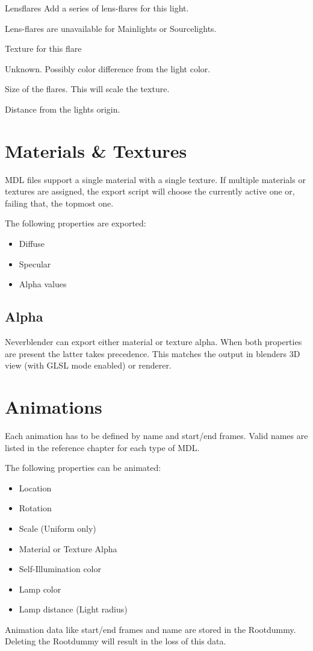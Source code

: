 \begin{propertyAurora}{Lensflares}
Add a series of lens-flares for this light.

Lens-flares are unavailable for Mainlights or Sourcelights.
\begin{description}[leftmargin=6em,style=nextline]
    \item[Texture] Texture for this flare
    \item[Colorshift] Unknown. Possibly color difference from the light color.
    \item[Size] Size of the flares. This will scale the texture.
    \item[Position] Distance from the lights origin.
\end{description}
\end{propertyAurora}

\section{Materials \& Textures}
MDL files support a single material with a single texture. If multiple 
materials or textures are assigned, the export script will choose the currently 
active one or, failing that, the topmost one.

The following properties are exported:
\begin{itemize}
    \item Diffuse
    \item Specular
    \item Alpha values
\end{itemize}

\subsection*{Alpha}
Neverblender can export either material or texture alpha. When both properties are present 
the latter takes precedence. This matches the output in blenders 3D view (with GLSL mode enabled) 
or renderer.

\section{Animations}
Each animation has to be defined by name and start/end frames. Valid names 
are listed in the reference chapter for each type of MDL.

The following properties can be animated:
\begin{itemize}
    \item Location
    \item Rotation
    \item Scale (Uniform only)
    \item Material or Texture Alpha
    \item Self-Illumination color
    \item Lamp color
    \item Lamp distance (Light radius)
\end{itemize}
Animation data like start/end frames and name are stored in the Rootdummy. Deleting the Rootdummy will result in
the loss of this data.